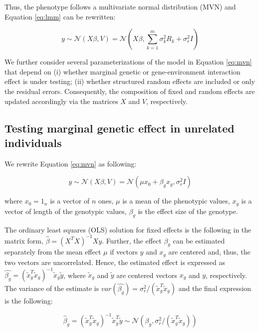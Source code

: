 \documentclass[]{book}
\theoremstyle{definition}
\theoremstyle{definition}
\theoremstyle{definition}
\theoremstyle{remark}
\begin{document}
Thus, the phenotype follows a multivariate normal distribution (MVN) and
Equation \eqref{eq:lmm} can be rewritten:

\begin{equation} 
  y \sim \mathcal{N} (X \beta, V) = \mathcal{N} (X \beta, \sum_{k=1}^{m}{\sigma_k^2 R_k} + \sigma_r^2 I) 
\label{eq:mvn}
\end{equation}

We further consider several parameterizations of the model in Equation
\eqref{eq:mvn} that depend on (i) whether marginal genetic or
gene-environment interaction effect is under testing; (ii) whether
structured random effects are included or only the residual errors.
Consequently, the composition of fixed and random effects are updated
accordingly via the matrices \(X\) and \(V\), respectively.

\subsection{Testing marginal genetic effect in unrelated
individuals}\label{lmg}

We rewrite Equation \eqref{eq:mvn} as following:

\begin{equation} 
  y \sim \mathcal{N} (X \beta, V) = \mathcal{N} (\mu x_0 + \beta_g x_g, \sigma_r^2 I) 
\label{eq:lmg}
\end{equation}

where \(x_0 = 1_n\) is a vector of \(n\) ones, \(\mu\) is a mean of the
phenotypic values, \(x_g\) is a vector of length of the genotypic
values, \(\beta_g\) is the effect size of the genotype.

The ordinary least squares (OLS) solution for fixed effects is the
following in the matrix form, \(\hat{\beta} = (X^T X)^{-1} X y\).
Further, the effect \(\beta_g\) can be estimated separately from the
mean effect \(\mu\) if vectors \(y\) and \(x_g\) are centered and, thus,
the two vectors are uncorrelated. Hence, the estimated effect is
expressed as
\(\hat{\beta_g} = (\tilde{x}_g^T \tilde{x}_g)^{-1} \tilde{x}_g \tilde{y}\),
where \(\tilde{x}_g\) and \(\tilde{y}\) are centered vectors \(x_g\) and
\(y\), respectively. The variance of the estimate is
\(var(\hat{\beta_g}) = \sigma_r^2 / (\tilde{x}_g^T \tilde{x}_g)\) and
the final expression is the following:

\begin{equation} 
  \hat{\beta}_g  = (\tilde{x}_g^T \tilde{x}_g)^{-1} \tilde{x}_g^T \tilde{y} \sim \mathcal{N} (\beta_g, \sigma_r^2 / (\tilde{x}_g^T \tilde{x}_g))
\label{eq:betahatlmg}
\end{equation}
\end{document}

